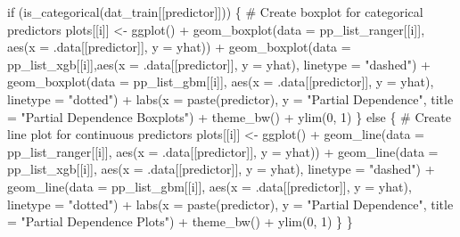 \documentclass[
  letterpaper,
  DIV=11,
  numbers=noendperiod]{scrartcl}
\newenvironment{Shaded}{\begin{snugshade}}{\end{snugshade}}
\newcommand{\AttributeTok}[1]{\textcolor[rgb]{0.40,0.45,0.13}{#1}}
\newcommand{\CommentTok}[1]{\textcolor[rgb]{0.37,0.37,0.37}{#1}}
\newcommand{\ControlFlowTok}[1]{\textcolor[rgb]{0.00,0.23,0.31}{#1}}
\newcommand{\DecValTok}[1]{\textcolor[rgb]{0.68,0.00,0.00}{#1}}
\newcommand{\FunctionTok}[1]{\textcolor[rgb]{0.28,0.35,0.67}{#1}}
\newcommand{\NormalTok}[1]{\textcolor[rgb]{0.00,0.23,0.31}{#1}}
\newcommand{\OtherTok}[1]{\textcolor[rgb]{0.00,0.23,0.31}{#1}}
\newcommand{\SpecialCharTok}[1]{\textcolor[rgb]{0.37,0.37,0.37}{#1}}
\newcommand{\StringTok}[1]{\textcolor[rgb]{0.13,0.47,0.30}{#1}}
\begin{document}
\begin{Shaded}
\begin{Highlighting}[]
  \ControlFlowTok{if}\NormalTok{ (}\FunctionTok{is\_categorical}\NormalTok{(dat\_train[[predictor]])) \{}
    \CommentTok{\# Create boxplot for categorical predictors}
\NormalTok{    plots[[i]] }\OtherTok{\textless{}{-}} \FunctionTok{ggplot}\NormalTok{() }\SpecialCharTok{+}
      \FunctionTok{geom\_boxplot}\NormalTok{(}\AttributeTok{data =}\NormalTok{ pp\_list\_ranger[[i]], }\FunctionTok{aes}\NormalTok{(}\AttributeTok{x =}\NormalTok{ .data[[predictor]], }\AttributeTok{y =}\NormalTok{ yhat)) }\SpecialCharTok{+}
      \FunctionTok{geom\_boxplot}\NormalTok{(}\AttributeTok{data =}\NormalTok{ pp\_list\_xgb[[i]],}\FunctionTok{aes}\NormalTok{(}\AttributeTok{x =}\NormalTok{ .data[[predictor]], }\AttributeTok{y =}\NormalTok{ yhat), }\AttributeTok{linetype =} \StringTok{"dashed"}\NormalTok{) }\SpecialCharTok{+}
      \FunctionTok{geom\_boxplot}\NormalTok{(}\AttributeTok{data =}\NormalTok{ pp\_list\_gbm[[i]], }\FunctionTok{aes}\NormalTok{(}\AttributeTok{x =}\NormalTok{ .data[[predictor]], }\AttributeTok{y =}\NormalTok{ yhat), }\AttributeTok{linetype =} \StringTok{"dotted"}\NormalTok{) }\SpecialCharTok{+}
      \FunctionTok{labs}\NormalTok{(}\AttributeTok{x =} \FunctionTok{paste}\NormalTok{(predictor), }\AttributeTok{y =} \StringTok{"Partial Dependence"}\NormalTok{, }\AttributeTok{title =} \StringTok{"Partial Dependence Boxplots"}\NormalTok{) }\SpecialCharTok{+}
      \FunctionTok{theme\_bw}\NormalTok{() }\SpecialCharTok{+}
      \FunctionTok{ylim}\NormalTok{(}\DecValTok{0}\NormalTok{, }\DecValTok{1}\NormalTok{)}
\NormalTok{  \} }\ControlFlowTok{else}\NormalTok{ \{}
    \CommentTok{\# Create line plot for continuous predictors}
\NormalTok{    plots[[i]] }\OtherTok{\textless{}{-}} \FunctionTok{ggplot}\NormalTok{() }\SpecialCharTok{+}
      \FunctionTok{geom\_line}\NormalTok{(}\AttributeTok{data =}\NormalTok{ pp\_list\_ranger[[i]], }\FunctionTok{aes}\NormalTok{(}\AttributeTok{x =}\NormalTok{ .data[[predictor]], }\AttributeTok{y =}\NormalTok{ yhat)) }\SpecialCharTok{+}
      \FunctionTok{geom\_line}\NormalTok{(}\AttributeTok{data =}\NormalTok{ pp\_list\_xgb[[i]], }\FunctionTok{aes}\NormalTok{(}\AttributeTok{x =}\NormalTok{ .data[[predictor]], }\AttributeTok{y =}\NormalTok{ yhat), }\AttributeTok{linetype =} \StringTok{"dashed"}\NormalTok{) }\SpecialCharTok{+}
      \FunctionTok{geom\_line}\NormalTok{(}\AttributeTok{data =}\NormalTok{ pp\_list\_gbm[[i]], }\FunctionTok{aes}\NormalTok{(}\AttributeTok{x =}\NormalTok{ .data[[predictor]], }\AttributeTok{y =}\NormalTok{ yhat), }\AttributeTok{linetype =} \StringTok{"dotted"}\NormalTok{) }\SpecialCharTok{+}
      \FunctionTok{labs}\NormalTok{(}\AttributeTok{x =} \FunctionTok{paste}\NormalTok{(predictor), }\AttributeTok{y =} \StringTok{"Partial Dependence"}\NormalTok{, }\AttributeTok{title =} \StringTok{"Partial Dependence Plots"}\NormalTok{) }\SpecialCharTok{+}
      \FunctionTok{theme\_bw}\NormalTok{() }\SpecialCharTok{+}
      \FunctionTok{ylim}\NormalTok{(}\DecValTok{0}\NormalTok{, }\DecValTok{1}\NormalTok{)}
\NormalTok{  \}}
\NormalTok{\}}


\end{Highlighting}
\end{Shaded}
\end{document}
